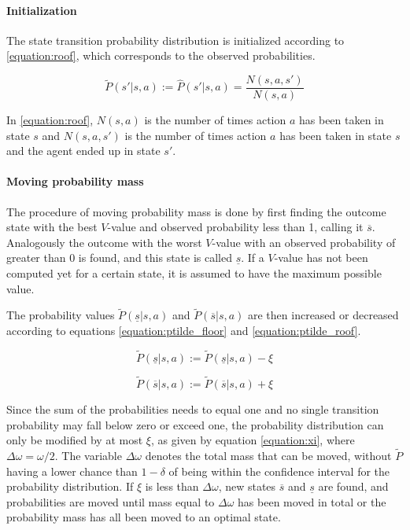 \paragraph{Initialization} The state transition probability distribution is initialized according to
\eqref{equation:roof}, which corresponds to the observed probabilities.

\begin{equation}
\label{equation:roof}
\tilde{P}(s'|s, a) := \hat{P}(s'|s, a) = \frac{N(s,a,s')}{N(s,a)}
\end{equation}

In \eqref{equation:roof}, $N(s, a)$ is the number of times action $a$ has been taken in
state $s$ and $N(s, a, s')$ is the number of times action $a$ has been taken in
state $s$ and the agent ended up in state $s'$.

\paragraph{Moving probability mass} The procedure of moving probability mass is done by first finding the outcome
state with the best $V$-value and observed probability less than 1, calling it
$\overline{s}$. Analogously the outcome with the worst $V$-value with an
observed probability of greater than 0 is found, and this state is called
$\underline{s}$. If a $V$-value has not been computed yet for a certain state, it is 
assumed to have the maximum possible value. 

The probability values $\tilde{P}(\underline{s}|s,a)$ and
$\tilde{P}(\overline{s}|s,a)$ are then increased or decreased according to
equations \eqref{equation:ptilde_floor} and \eqref{equation:ptilde_roof}.

\begin{equation}
\label{equation:ptilde_floor}
\tilde{P}(\underline{s}|s,a) := \tilde{P}(\underline{s}|s,a)-\xi
\end{equation}

\begin{equation}
\label{equation:ptilde_roof}
\tilde{P}(\overline{s}|s,a) := \tilde{P}(\overline{s}|s,a)+\xi
\end{equation}

Since the sum of the probabilities needs to equal one and 
no single transition probability may fall below zero or exceed one, the probability distribution can only be modified by at most $\xi$, as given by
equation \eqref{equation:xi}, where $\Delta\omega = \omega / 2$. The variable $\Delta\omega$ denotes the total mass that can be moved, without $\tilde{P}$ having a lower chance than $1 - \delta$ of being within the confidence interval for the probability distribution. If $\xi$ is less than $\Delta \omega$, new states
$\overline{s}$ and $\underline{s}$ are found, and probabilities are moved until
mass equal to $\Delta \omega$ has been moved in total or the probability mass has all been moved to an optimal state. 

